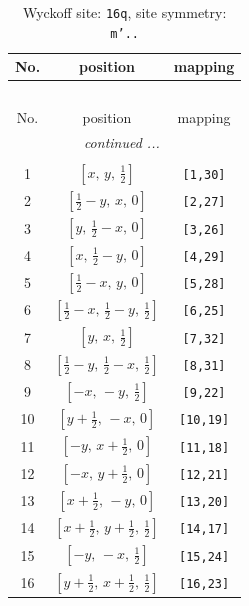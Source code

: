 \documentclass[fleqn,8pt]{jsarticle}
\begin{document}
\renewcommand{\arraystretch}{1.2}
\begin{longtable}{ccc}
\caption{Wyckoff site: {\tt 16q}, site symmetry: {\tt m'..}}
 \\
 \hline \hline
No. & position & mapping \\ \hline \endfirsthead

\multicolumn{2}{l}{\tablename\ \thetable{}} \\
 \hline \hline
No. & position & mapping \\ \hline \endhead

 \hline \hline
\multicolumn{2}{r}{\footnotesize\it continued ...} \\ \endfoot

 \hline \hline
\multicolumn{2}{r}{} \\ \endlastfoot

1 & $\left[ x,\, y,\, \frac{1}{2} \right]$ & {\tt [1,30]} \\ \hline
2 & $\left[ \frac{1}{2} - y,\, x,\, 0 \right]$ & {\tt [2,27]} \\ \hline
3 & $\left[ y,\, \frac{1}{2} - x,\, 0 \right]$ & {\tt [3,26]} \\ \hline
4 & $\left[ x,\, \frac{1}{2} - y,\, 0 \right]$ & {\tt [4,29]} \\ \hline
5 & $\left[ \frac{1}{2} - x,\, y,\, 0 \right]$ & {\tt [5,28]} \\ \hline
6 & $\left[ \frac{1}{2} - x,\, \frac{1}{2} - y,\, \frac{1}{2} \right]$ & {\tt [6,25]} \\ \hline
7 & $\left[ y,\, x,\, \frac{1}{2} \right]$ & {\tt [7,32]} \\ \hline
8 & $\left[ \frac{1}{2} - y,\, \frac{1}{2} - x,\, \frac{1}{2} \right]$ & {\tt [8,31]} \\ \hline
9 & $\left[ - x,\, - y,\, \frac{1}{2} \right]$ & {\tt [9,22]} \\ \hline
10 & $\left[ y + \frac{1}{2},\, - x,\, 0 \right]$ & {\tt [10,19]} \\ \hline
11 & $\left[ - y,\, x + \frac{1}{2},\, 0 \right]$ & {\tt [11,18]} \\ \hline
12 & $\left[ - x,\, y + \frac{1}{2},\, 0 \right]$ & {\tt [12,21]} \\ \hline
13 & $\left[ x + \frac{1}{2},\, - y,\, 0 \right]$ & {\tt [13,20]} \\ \hline
14 & $\left[ x + \frac{1}{2},\, y + \frac{1}{2},\, \frac{1}{2} \right]$ & {\tt [14,17]} \\ \hline
15 & $\left[ - y,\, - x,\, \frac{1}{2} \right]$ & {\tt [15,24]} \\ \hline
16 & $\left[ y + \frac{1}{2},\, x + \frac{1}{2},\, \frac{1}{2} \right]$ & {\tt [16,23]} \\
\end{longtable}
\end{document}
